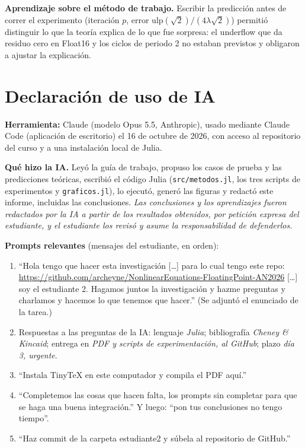 \documentclass[11pt]{article}
\begin{document}
\textbf{Aprendizaje sobre el método de trabajo.} Escribir la predicción antes de correr el experimento (iteración $p$, error $\mathrm{ulp}(\sqrt2)/(4\lambda\sqrt2)$) permitió distinguir lo que la teoría explica de lo que fue sorpresa: el underflow que da residuo cero en Float16 y los ciclos de periodo 2 no estaban previstos y obligaron a ajustar la explicación.

\section{Declaración de uso de IA}
\textbf{Herramienta:} Claude (modelo Opus 5.5, Anthropic), usado mediante Claude Code (aplicación de escritorio) el 16 de octubre de 2026, con acceso al repositorio del curso y a una instalación local de Julia.

\textbf{Qué hizo la IA.} Leyó la guía de trabajo, propuso los casos de prueba y las predicciones teóricas, escribió el código Julia (\texttt{src/metodos.jl}, los tres scripts de experimentos y \texttt{graficos.jl}), lo ejecutó, generó las figuras y redactó este informe, incluidas las conclusiones. \emph{Las conclusiones y los aprendizajes fueron redactados por la IA a partir de los resultados obtenidos, por petición expresa del estudiante, y el estudiante los revisó y asume la responsabilidad de defenderlos.}

\textbf{Prompts relevantes} (mensajes del estudiante, en orden):
\begin{enumerate}
\item ``Hola tengo que hacer esta investigación [\dots] para lo cual tengo este repo: \url{https://github.com/archeyne/NonlinearEquations-FloatingPoint-AN2026} [\dots] soy el estudiante 2. Hagamos juntos la investigación y hazme preguntas y charlamos y hacemos lo que tenemos que hacer.'' (Se adjuntó el enunciado de la tarea.)
\item Respuestas a las preguntas de la IA: lenguaje \emph{Julia}; bibliografía \emph{Cheney \& Kincaid}; entrega en \emph{PDF y scripts de experimentación, al GitHub}; plazo \emph{día 3, urgente}.
\item ``Instala TinyTeX en este computador y compila el PDF aquí.''
\item ``Completemos las cosas que hacen falta, los prompts sin completar para que se haga una buena integración.'' Y luego: ``pon tus conclusiones no tengo tiempo''.
\item ``Haz commit de la carpeta estudiante2 y súbela al repositorio de GitHub.''
\end{enumerate}
\end{document}
